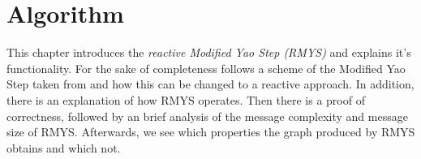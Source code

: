 %
%
\section{Algorithm}
This chapter introduces the \emph{reactive Modified Yao Step (RMYS)} and explains it's functionality.
For the sake of completeness follows a scheme of the Modified Yao Step taken from \cite{kanj} and how this can be changed to a reactive approach.
In addition, there is an explanation of how RMYS operates.
Then there is a proof of correctness, followed by an brief analysis of the message complexity and message size of RMYS.
Afterwards, we see which properties the graph produced by RMYS obtains and which not.

